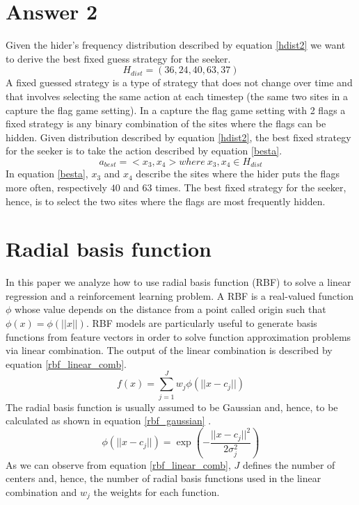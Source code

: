 \documentclass[runningheads]{llncs}
\begin{document}
\section{Answer 2}
Given the hider's frequency distribution described by equation \ref{hdist2}
we want to derive the best fixed guess strategy for the seeker.
\begin{equation}\label{hdist2}
  H_{dist} = (36, 24, 40, 63, 37)
\end{equation}
A fixed guessed strategy is a type of strategy that does not change
over time and that involves selecting the same action at each
timestep (the same two sites in a capture the flag game setting). In a
capture the flag game setting with 2 flags a fixed strategy is any
binary combination of the sites where the flags can be hidden. Given
distribution described by equation \ref{hdist2}, the best fixed
strategy for the seeker is to take the action described by equation
\ref{besta}.
\begin{equation}\label{besta}
  a_{best} = <x_3, x_4> where \:x_3, x_4 \in H_{dist}
\end{equation}
In equation \ref{besta}, $x_3$ and $x_4$ describe the sites where the
hider puts the flags more often, respectively $40$ and $63$ times. The
best fixed strategy for the seeker, hence, is to select the two sites
where the flags are most frequently hidden.





\section{Radial basis function}\label{RBF}
In this paper we analyze how to use radial basis function (RBF) to
solve a linear regression and a reinforcement learning problem. A RBF
is a real-valued function $\phi$ whose value depends on the distance
from a point called origin such that $\phi(x) = \phi(||x||)$. RBF
models are particularly useful to generate basis functions from
feature vectors in order to solve function approximation problems via
linear combination. The output of the linear combination is described
by equation \ref{rbf_linear_comb}.
\begin{equation}\label{rbf_linear_comb}
  f(x) = \sum_{j=1}^{J}w_j\phi(||x-c_j||)
\end{equation}
The radial basis function is usually assumed to be Gaussian and,
hence, to be calculated as shown in equation \ref{rbf_gaussian}
\cite{rlbook}.
\begin{equation}\label{rbf_gaussian}
\phi(||x-c_j||) = \exp\left(-\frac{||x-c_j||^2}{2\sigma^2_j}\right)
\end{equation}
As we can observe from equation \ref{rbf_linear_comb}, $J$ defines the
number of centers and, hence, the number of radial basis functions used
in the linear combination and $w_j$ the weights for each function.
\end{document}
